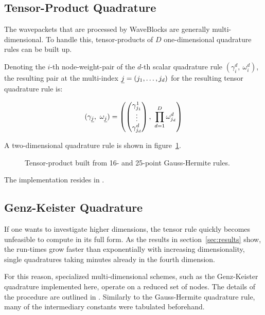 \subsection{Tensor-Product Quadrature}
\label{subsec:tpquad}

The wavepackets that are processed by WaveBlocks are generally multi-dimensional.
To handle this, tensor-products of $D$ one-dimensional quadrature rules can be
built up.

Denoting the $i$-th node-weight-pair of the $d$-th scalar quadrature rule
$(\gamma_i^d,\ \omega_i^d)$, the resulting pair at the multi-index $\underline{j} =
(j_1, \ldots, j_d)$ for the resulting tensor quadrature rule is:

\begin{equation}
  (\gamma_{\underline{j}},\ \omega_{\underline{j}}) = \left(
    \begin{pmatrix} \gamma_{j_1}^1 \\ \vdots \\ \gamma_{j_d}^d \end{pmatrix},
    \ \prod_{d=1}^D \omega_{j_d}^d
  \right)
\end{equation}

A two-dimensional quadrature rule is shown in figure~\ref{fig:tpexample}.

\begin{figure}
  \center
  
  \caption{Tensor-product built from 16- and 25-point Gauss-Hermite rules.}
  \label{fig:tpexample}
\end{figure}

The implementation resides in .


\subsection{Genz-Keister Quadrature}
\label{subsec:gkquad}

If one wants to investigate higher dimensions, the tensor rule quickly becomes
unfeasible to compute in its full form.
As the results in section~\ref{sec:results} show, the run-times grow faster than
exponentially with increasing dimensionality, single quadratures taking minutes
already in the fourth dimension.

For this reason, specialized multi-dimensional schemes, such as the Genz-Keister
quadrature implemented here, operate on a reduced set of nodes.
The details of the procedure are outlined in \cite{B15_601}.
Similarly to the Gauss-Hermite quadrature rule, many of the intermediary
constants were tabulated beforehand.

